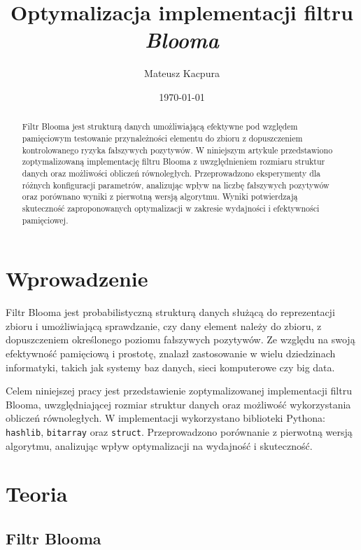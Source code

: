 \documentclass{article}
\begin{document}
\title{Optymalizacja implementacji filtru \textit{Blooma}}
\author{Mateusz Kacpura}
\date{\today}

\maketitle

\begin{abstract}
Filtr Blooma jest strukturą danych umożliwiającą efektywne pod względem pamięciowym testowanie przynależności elementu do zbioru z dopuszczeniem kontrolowanego ryzyka fałszywych pozytywów. W niniejszym artykule przedstawiono zoptymalizowaną implementację filtru Blooma z uwzględnieniem rozmiaru struktur danych oraz możliwości obliczeń równoległych. Przeprowadzono eksperymenty dla różnych konfiguracji parametrów, analizując wpływ na liczbę fałszywych pozytywów oraz porównano wyniki z pierwotną wersją algorytmu. Wyniki potwierdzają skuteczność zaproponowanych optymalizacji w zakresie wydajności i efektywności pamięciowej.
\end{abstract}

\tableofcontents

\newpage

\section{Wprowadzenie}

Filtr Blooma \cite{bloom1970} jest probabilistyczną strukturą danych służącą do reprezentacji zbioru i umożliwiającą sprawdzanie, czy dany element należy do zbioru, z dopuszczeniem określonego poziomu fałszywych pozytywów. Ze względu na swoją efektywność pamięciową i prostotę, znalazł zastosowanie w wielu dziedzinach informatyki, takich jak systemy baz danych, sieci komputerowe czy big data.

Celem niniejszej pracy jest przedstawienie zoptymalizowanej implementacji filtru Blooma, uwzględniającej rozmiar struktur danych oraz możliwość wykorzystania obliczeń równoległych. W implementacji wykorzystano biblioteki Pythona: \texttt{hashlib}, \texttt{bitarray} oraz \texttt{struct}. Przeprowadzono porównanie z pierwotną wersją algorytmu, analizując wpływ optymalizacji na wydajność i skuteczność.

\section{Teoria}

\subsection{Filtr Blooma}
\end{document}
